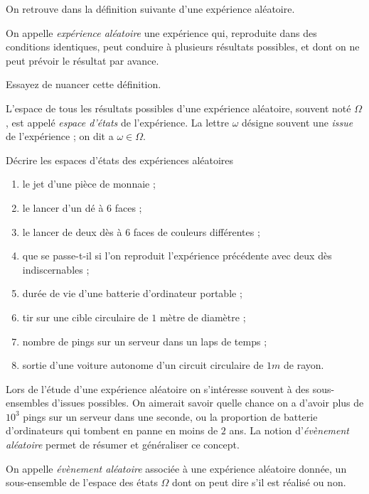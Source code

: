 \documentclass[11pt, a4paper]{article}
\begin{document}
On retrouve dans \cite{aleaprobasIX} la définition suivante d'une
expérience aléatoire.
\begin{defn}
  On appelle \emph{expérience aléatoire} une expérience qui, reproduite
  dans des conditions identiques, peut conduire à plusieurs résultats
  possibles, et dont on ne peut prévoir le résultat par avance.
\end{defn}
\begin{question}
  Essayez de nuancer cette définition.
\end{question}
\begin{defn}
  L'espace de tous les résultats possibles d'une expérience aléatoire,
  souvent noté $\Omega$, est appelé \emph{espace d'états} de
  l'expérience. La lettre $\omega$ désigne souvent une \emph{issue} de
  l'expérience ; on dit a $\omega \in \Omega$.
\end{defn}
\begin{question}
  Décrire les espaces d'états des expériences aléatoires
  \begin{enumerate}
  \item le jet d'une pièce de monnaie ;
  \item le lancer d'un dé à $6$ faces ;
  \item le lancer de deux dès à $6$ faces de couleurs différentes ;
  \item que se passe-t-il si l'on reproduit l'expérience précédente
    avec deux dès indiscernables ;
  \item durée de vie d'une batterie d'ordinateur portable ;
  \item tir sur une cible circulaire de $1$ mètre de diamètre ;
  \item nombre de pings sur un serveur dans un laps de temps ;
  \item sortie d'une voiture autonome d'un circuit circulaire de $1m$
    de rayon.
  \end{enumerate}
\end{question}
Lors de l'étude d'une expérience aléatoire on s'intéresse souvent à
des sous-ensembles d'issues possibles. On aimerait savoir quelle
chance on a d'avoir plus de $10^3$ pings sur un serveur dans une
seconde, ou la proportion de batterie d'ordinateurs qui tombent en
panne en moins de $2$ ans. La notion d'\textit{évènement aléatoire}
permet de résumer et généraliser ce concept.
\begin{defn}
  On appelle \emph{évènement aléatoire} associée à une expérience
  aléatoire donnée, un sous-ensemble de l'espace des états $\Omega$
  dont on peut dire s'il est réalisé ou non.
\end{defn}
\end{document}
